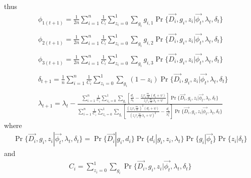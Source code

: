 \documentclass{article}
\begin{document}
thus
\begin{align}
&\phi_{1 (t + 1)} = \frac{1}{2n} \sum_{i=1}^{n} \frac{1}{C_i} \sum_{z_i = 0}^{1} \sum_{g_i} g_{i,1} \Pr\{\vec{D_i}, g_i, z_i | \vec{\phi_{t}}, \lambda_{t}, \delta_{t}\} \\
\nonumber \\
&\phi_{2 (t + 1)} = \frac{1}{2n} \sum_{i=1}^{n} \frac{1}{C_i} \sum_{z_i = 0}^{1} \sum_{g_i} g_{i,2} \Pr\{\vec{D_i}, g_i, z_i | \vec{\phi_{t}}, \lambda_{t}, \delta_{t}\} \\
\nonumber \\
&\phi_{3 (t + 1)} = \frac{1}{2n} \sum_{i=1}^{n} \frac{1}{C_i} \sum_{z_i = 0}^{1} \sum_{g_i} g_{i,3} \Pr\{\vec{D_i}, g_i, z_i | \vec{\phi_{t}}, \lambda_{t}, \delta_{t}\} \\
\nonumber \\
&\delta_{t + 1} = \frac{1}{n} \sum_{i=1}^{n} \frac{1}{C_i} \sum_{z_i  = 0}^{1} \sum_{g_i} (1 - z_i) \Pr\{\vec{D_i}, g_i, z_i | \vec{\phi_{t}}, \lambda_{t}, \delta_{t}\} \\
\nonumber \\
&\lambda_{t + 1} = \lambda_{t} - \frac{\displaystyle{\sum_{i=1}^{n} \frac{1}{C_i} \sum_{z_i = 0}^{1} \sum_{g_i} \left[ \frac{d_i}{\lambda_{t}} - \frac{z_i r_i \frac{m_i}{2} (d_i + \psi)}{z_i r_i \frac{m_i}{2} \lambda_{t} + \psi} \right]} \Pr\{\vec{D_i}, g_i, z_i | \vec{\phi_{t}}, \lambda_{t}, \delta_{t}\}}{\displaystyle{\sum_{i=1}^{n} \frac{1}{C_i} \sum_{z_i = 0}^{1} \sum_{g_i} \left[ \frac{(z_i r_i \frac{m_i}{2})^2 (d_i + \psi)}{(z_i r_i \frac{m_i}{2} \lambda_{t} + \psi)^2} - \frac{d_i}{\lambda_{t}^2} \right]} \Pr\{\vec{D_i}, g_i, z_i | \vec{\phi_{t}}, \lambda_{t}, \delta_{t}\}}
\end{align}
where
\begin{align*}
\Pr\{\vec{D_i}, g_i, z_i | \vec{\phi_{t}}, \lambda_{t}, \delta_{t}\} = \Pr\{\vec{D_i} | g_i, d_i\} \Pr\{d_i | g_i, z_i, \lambda_{t}\} \Pr\{g_i | \vec{\phi_{t}}\} \Pr\{z_i | \delta_{t}\}
\end{align*}
and
\begin{align*}
C_i = \sum_{z_i=0}^{1} \sum_{g_i} \Pr\{\vec{D_i}, g_i, z_i | \vec{\phi_{t}}, \lambda_{t}, \delta_{t}\}
\end{align*}
\end{document}

